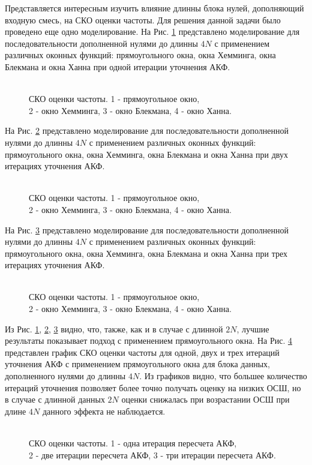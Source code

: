 Представляется интересным изучить влияние длинны блока нулей, дополняющий входную смесь, на СКО оценки частоты. Для решения данной задачи было проведено еще одно моделирование.
На Рис. \ref{pic:fft4_1} представлено моделирование для последовательности дополненной нулями до длинны ${4N}$ с применением различных оконных функций:
прямоугольного окна, окна Хемминга, окна Блекмана и окна Ханна при одной итерации уточнения АКФ.
\begin{figure}[h]
	\center{}
	\caption{\\СКО оценки частоты. 1 - прямоугольное окно,\\2 - окно Хемминга, 3 - окно Блекмана, 4 - окно Ханна.}
	\label{pic:fft4_1}
\end{figure}

На Рис. \ref{pic:fft4_2} представлено моделирование для последовательности дополненной нулями до длинны ${4N}$ с применением различных оконных функций:
прямоугольного окна, окна Хемминга, окна Блекмана и окна Ханна при двух итерациях уточнения АКФ.
\begin{figure}[h]
	\center{}
	\caption{\\СКО оценки частоты. 1 - прямоугольное окно,\\2 - окно Хемминга, 3 - окно Блекмана, 4 - окно Ханна.}
	\label{pic:fft4_2}
\end{figure}

На Рис. \ref{pic:fft4_3} представлено моделирование для последовательности дополненной нулями до длинны ${4N}$ с применением различных оконных функций:
прямоугольного окна, окна Хемминга, окна Блекмана и окна Ханна при трех итерациях уточнения АКФ.
\begin{figure}[h]
	\center{}
	\caption{\\СКО оценки частоты. 1 - прямоугольное окно,\\2 - окно Хемминга, 3 - окно Блекмана, 4 - окно Ханна.}
	\label{pic:fft4_3}
\end{figure}

Из Рис. \ref{pic:fft4_1}, \ref{pic:fft4_2}, \ref{pic:fft4_3} видно, что, также, как и в случае с длинной ${2N}$, лучшие результаты показывает подход с применением прямоугольного окна.
На Рис. \ref{pic:fft4_rect_1_2_3}
представлен график СКО оценки частоты для одной, двух и трех итераций уточнения АКФ с применением прямоугольного окна для блока данных, дополненного нулями до длинны ${4N}$.
Из графиков видно, что большее количество итераций уточнения позволяет более точно получать оценку на низких ОСШ, но в случае с длинной данных ${2N}$ оценки снижалась при
возрастании ОСШ при длине ${4N}$ данного эффекта не наблюдается.
\begin{figure}[h]
	\center{}
	\caption{\\СКО оценки частоты. 1 - одна итерация пересчета АКФ,\\2 - две итерации пересчета АКФ, 3 - три итерации пересчета АКФ.}
	\label{pic:fft4_rect_1_2_3}
\end{figure}

